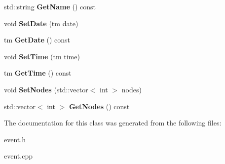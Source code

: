 \begin{DoxyCompactItemize}
\item 
\hypertarget{classEvent_af4202c6d2371029b117d37ba7cc12ae6}{std\-::string {\bfseries \-Get\-Name} () const }\label{classEvent_af4202c6d2371029b117d37ba7cc12ae6}

\item 
\hypertarget{classEvent_a5f606cada35150b7c9ad554f4252b53c}{void {\bfseries \-Set\-Date} (tm date)}\label{classEvent_a5f606cada35150b7c9ad554f4252b53c}

\item 
\hypertarget{classEvent_a0d3002c0e3961c360fa0f11412bf1e5c}{tm {\bfseries \-Get\-Date} () const }\label{classEvent_a0d3002c0e3961c360fa0f11412bf1e5c}

\item 
\hypertarget{classEvent_a693cefccd31003ade280a7e737f8be6c}{void {\bfseries \-Set\-Time} (tm time)}\label{classEvent_a693cefccd31003ade280a7e737f8be6c}

\item 
\hypertarget{classEvent_aad5efdddefaa7de4196d1f22fce2c51e}{tm {\bfseries \-Get\-Time} () const }\label{classEvent_aad5efdddefaa7de4196d1f22fce2c51e}

\item 
\hypertarget{classEvent_a8f68ec5701be042f63a4f277af171adc}{void {\bfseries \-Set\-Nodes} (std\-::vector$<$ int $>$ nodes)}\label{classEvent_a8f68ec5701be042f63a4f277af171adc}

\item 
\hypertarget{classEvent_ae3b200210aa9e4f20db5221d13d4746e}{std\-::vector$<$ int $>$ {\bfseries \-Get\-Nodes} () const }\label{classEvent_ae3b200210aa9e4f20db5221d13d4746e}

\end{DoxyCompactItemize}


\-The documentation for this class was generated from the following files\-:\begin{DoxyCompactItemize}
\item 
event.\-h\item 
event.\-cpp\end{DoxyCompactItemize}
